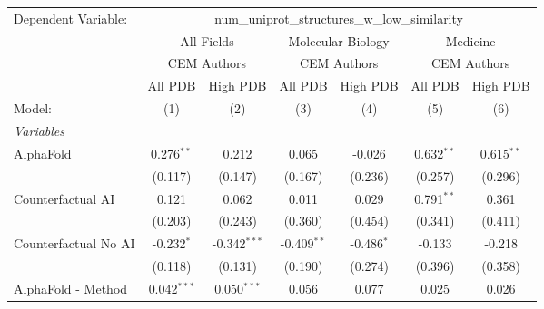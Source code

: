 \begingroup
\centering
\begin{tabular}{lcccccc}
   \tabularnewline \midrule \midrule
   Dependent Variable: & \multicolumn{6}{c}{num\_uniprot\_structures\_w\_low\_similarity}\\
 & \multicolumn{2}{c}{All Fields} & \multicolumn{2}{c}{Molecular Biology} & \multicolumn{2}{c}{Medicine} \\
\cmidrule(lr){2-3} \cmidrule(lr){4-5} \cmidrule(lr){6-7}
 & \multicolumn{2}{c}{CEM Authors} & \multicolumn{2}{c}{CEM Authors} & \multicolumn{2}{c}{CEM Authors} \\
\cmidrule(lr){2-3} \cmidrule(lr){4-5} \cmidrule(lr){6-7}
 & \multicolumn{1}{c}{All PDB} & \multicolumn{1}{c}{High PDB} & \multicolumn{1}{c}{All PDB} & \multicolumn{1}{c}{High PDB} & \multicolumn{1}{c}{All PDB} & \multicolumn{1}{c}{High PDB} \\
\cmidrule(lr){2-2} \cmidrule(lr){3-3} \cmidrule(lr){4-4} \cmidrule(lr){5-5} \cmidrule(lr){6-6} \cmidrule(lr){7-7}
   Model:                                                     & (1)           & (2)            & (3)           & (4)           & (5)           & (6)\\  
   \midrule
   \emph{Variables}\\
   AlphaFold                                                  & 0.276$^{**}$  & 0.212          & 0.065         & -0.026        & 0.632$^{**}$  & 0.615$^{**}$\\   
                                                              & (0.117)       & (0.147)        & (0.167)       & (0.236)       & (0.257)       & (0.296)\\   
   Counterfactual AI                                          & 0.121         & 0.062          & 0.011         & 0.029         & 0.791$^{**}$  & 0.361\\   
                                                              & (0.203)       & (0.243)        & (0.360)       & (0.454)       & (0.341)       & (0.411)\\   
   Counterfactual No AI                                       & -0.232$^{*}$  & -0.342$^{***}$ & -0.409$^{**}$ & -0.486$^{*}$  & -0.133        & -0.218\\   
                                                              & (0.118)       & (0.131)        & (0.190)       & (0.274)       & (0.396)       & (0.358)\\   
   AlphaFold - Method                                         & 0.042$^{***}$ & 0.050$^{***}$  & 0.056         & 0.077         & 0.025         & 0.026\\   

\end{tabular}
